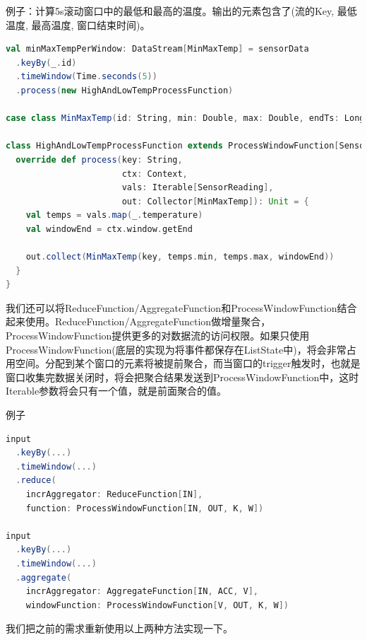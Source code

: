 \documentclass[oneside]{ctexbook}
\begin{document}
例子：计算5s滚动窗口中的最低和最高的温度。输出的元素包含了(流的Key, 最低温度, 最高温度, 窗口结束时间)。

\begin{lstlisting}[language=scala]
val minMaxTempPerWindow: DataStream[MinMaxTemp] = sensorData
  .keyBy(_.id)
  .timeWindow(Time.seconds(5))
  .process(new HighAndLowTempProcessFunction)

case class MinMaxTemp(id: String, min: Double, max: Double, endTs: Long)

class HighAndLowTempProcessFunction extends ProcessWindowFunction[SensorReading, MinMaxTemp, String, TimeWindow] {
  override def process(key: String,
                       ctx: Context,
                       vals: Iterable[SensorReading],
                       out: Collector[MinMaxTemp]): Unit = {
    val temps = vals.map(_.temperature)
    val windowEnd = ctx.window.getEnd

    out.collect(MinMaxTemp(key, temps.min, temps.max, windowEnd))
  }
}
\end{lstlisting}

我们还可以将ReduceFunction/AggregateFunction和ProcessWindowFunction结合起来使用。ReduceFunction/AggregateFunction做增量聚合，ProcessWindowFunction提供更多的对数据流的访问权限。如果只使用ProcessWindowFunction(底层的实现为将事件都保存在ListState中)，将会非常占用空间。分配到某个窗口的元素将被提前聚合，而当窗口的trigger触发时，也就是窗口收集完数据关闭时，将会把聚合结果发送到ProcessWindowFunction中，这时Iterable参数将会只有一个值，就是前面聚合的值。

例子

\begin{lstlisting}[language=scala]
input
  .keyBy(...)
  .timeWindow(...)
  .reduce(
    incrAggregator: ReduceFunction[IN],
    function: ProcessWindowFunction[IN, OUT, K, W])

input
  .keyBy(...)
  .timeWindow(...)
  .aggregate(
    incrAggregator: AggregateFunction[IN, ACC, V],
    windowFunction: ProcessWindowFunction[V, OUT, K, W])
\end{lstlisting}

我们把之前的需求重新使用以上两种方法实现一下。
\end{document}
